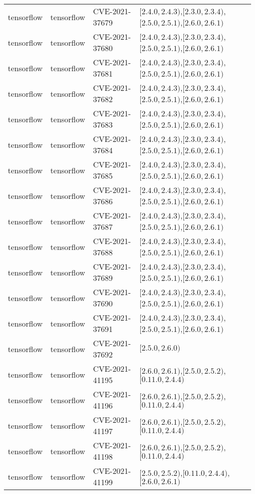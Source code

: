 \begin{tabular}{llll}
tensorflow & tensorflow & CVE-2021-37679 & $[2.4.0,2.4.3)$,$[2.3.0,2.3.4)$,$[2.5.0,2.5.1)$,$[2.6.0,2.6.1)$ \\
tensorflow & tensorflow & CVE-2021-37680 & $[2.4.0,2.4.3)$,$[2.3.0,2.3.4)$,$[2.5.0,2.5.1)$,$[2.6.0,2.6.1)$ \\
tensorflow & tensorflow & CVE-2021-37681 & $[2.4.0,2.4.3)$,$[2.3.0,2.3.4)$,$[2.5.0,2.5.1)$,$[2.6.0,2.6.1)$ \\
tensorflow & tensorflow & CVE-2021-37682 & $[2.4.0,2.4.3)$,$[2.3.0,2.3.4)$,$[2.5.0,2.5.1)$,$[2.6.0,2.6.1)$ \\
tensorflow & tensorflow & CVE-2021-37683 & $[2.4.0,2.4.3)$,$[2.3.0,2.3.4)$,$[2.5.0,2.5.1)$,$[2.6.0,2.6.1)$ \\
tensorflow & tensorflow & CVE-2021-37684 & $[2.4.0,2.4.3)$,$[2.3.0,2.3.4)$,$[2.5.0,2.5.1)$,$[2.6.0,2.6.1)$ \\
tensorflow & tensorflow & CVE-2021-37685 & $[2.4.0,2.4.3)$,$[2.3.0,2.3.4)$,$[2.5.0,2.5.1)$,$[2.6.0,2.6.1)$ \\
tensorflow & tensorflow & CVE-2021-37686 & $[2.4.0,2.4.3)$,$[2.3.0,2.3.4)$,$[2.5.0,2.5.1)$,$[2.6.0,2.6.1)$ \\
tensorflow & tensorflow & CVE-2021-37687 & $[2.4.0,2.4.3)$,$[2.3.0,2.3.4)$,$[2.5.0,2.5.1)$,$[2.6.0,2.6.1)$ \\
tensorflow & tensorflow & CVE-2021-37688 & $[2.4.0,2.4.3)$,$[2.3.0,2.3.4)$,$[2.5.0,2.5.1)$,$[2.6.0,2.6.1)$ \\
tensorflow & tensorflow & CVE-2021-37689 & $[2.4.0,2.4.3)$,$[2.3.0,2.3.4)$,$[2.5.0,2.5.1)$,$[2.6.0,2.6.1)$ \\
tensorflow & tensorflow & CVE-2021-37690 & $[2.4.0,2.4.3)$,$[2.3.0,2.3.4)$,$[2.5.0,2.5.1)$,$[2.6.0,2.6.1)$ \\
tensorflow & tensorflow & CVE-2021-37691 & $[2.4.0,2.4.3)$,$[2.3.0,2.3.4)$,$[2.5.0,2.5.1)$,$[2.6.0,2.6.1)$ \\
tensorflow & tensorflow & CVE-2021-37692 & $[2.5.0,2.6.0)$ \\
tensorflow & tensorflow & CVE-2021-41195 & $[2.6.0,2.6.1)$,$[2.5.0,2.5.2)$,$[0.11.0,2.4.4)$ \\
tensorflow & tensorflow & CVE-2021-41196 & $[2.6.0,2.6.1)$,$[2.5.0,2.5.2)$,$[0.11.0,2.4.4)$ \\
tensorflow & tensorflow & CVE-2021-41197 & $[2.6.0,2.6.1)$,$[2.5.0,2.5.2)$,$[0.11.0,2.4.4)$ \\
tensorflow & tensorflow & CVE-2021-41198 & $[2.6.0,2.6.1)$,$[2.5.0,2.5.2)$,$[0.11.0,2.4.4)$ \\
tensorflow & tensorflow & CVE-2021-41199 & $[2.5.0,2.5.2)$,$[0.11.0,2.4.4)$,$[2.6.0,2.6.1)$ \\

\end{tabular}
